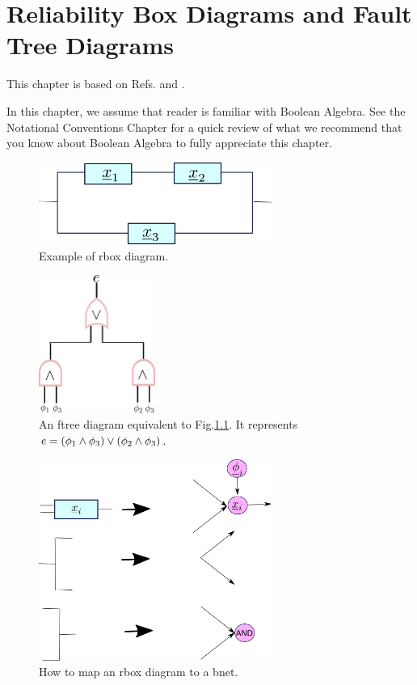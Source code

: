 \chapter{Reliability Box Diagrams and Fault 
Tree Diagrams}
This chapter is based on
Refs.\cite{reliasoft}
and \cite{ftree-manual}.

In this chapter, we assume that
reader is familiar
with
Boolean Algebra. See 
the Notational 
Conventions Chapter 
for a quick review 
of what
we recommend that you know about
Boolean Algebra
to fully appreciate this chapter.

\begin{figure}[h!]
\centering
\includegraphics[width=3in]
{reliability/relia-example.png}
\caption{Example of rbox diagram.} 
\label{fig-relia-rbox}
\end{figure}

\begin{figure}[h!]
\centering
\includegraphics[width=1.5in]
{reliability/relia-ftree.png}
\caption{An ftree diagram equivalent to
Fig.\ref{fig-relia-rbox}. It
represents 
$e=(\phi_1\wedge \phi_3)\vee(\phi_2\wedge\phi_3)$. } 
\label{fig-relia-ftree}
\end{figure}

\begin{figure}[h!]
\centering
\includegraphics[width=3in]
{reliability/relia-map.png}
\caption{How to map an rbox diagram to a bnet.} 
\label{fig-relia-map}
\end{figure}

